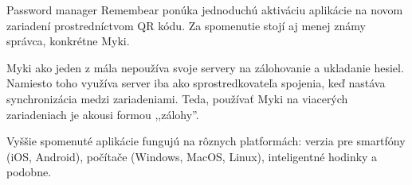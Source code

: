 Password manager Remembear ponúka jednoduchú aktiváciu aplikácie na novom zariadení prostredníctvom QR kódu. Za spomenutie stojí aj menej známy správca, konkrétne Myki.

Myki ako jeden z mála nepoužíva svoje servery na zálohovanie a ukladanie hesiel. Namiesto toho využíva server iba ako sprostredkovateľa \cite{myki} spojenia, keď nastáva synchronizácia medzi zariadeniami. Teda, používať Myki na viacerých zariadeniach je akousi formou ,,zálohy''.

Vyššie spomenuté aplikácie fungujú na rôznych platformách: verzia pre smartfóny (iOS, Android), počítače (Windows, MacOS, Linux), inteligentné hodinky a podobne.